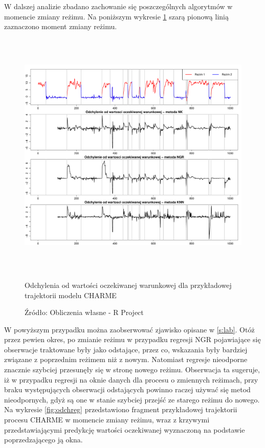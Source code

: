 \documentclass[man,mfu]{mgrwms}
\begin{document}
W dalszej analizie zbadano zachowanie się poszczególnych algorytmów w momencie zmiany reżimu. Na poniższym wykresie \ref{odch1} szarą pionową linią zaznaczono moment zmiany reżimu.

\begin{figure}[H]
\centering
\includegraphics[width=160mm,height = 120mm]{compreg}
\caption{Odchylenia od wartości oczekiwanej warunkowej dla przykładowej trajektorii modelu CHARME}
\caption*{Źródło: Obliczenia własne - R Project}
\label{odch1}
\end{figure}


W powyższym przypadku można zaobserwować zjawisko opisane w \ref{s:lab}. Otóż przez pewien okres, po zmianie reżimu w przypadku regresji NGR pojawiające się obserwacje traktowane były jako odstające, przez co, wskazania były bardziej związane z poprzednim reżimem niż z nowym. Natomiast regresje nieodporne znacznie szybciej przesunęły się w stronę nowego reżimu. Obserwacja ta sugeruje, iż w przypadku regresji na oknie danych dla procesu o zmiennych reżimach, przy braku występujących obserwacji odstających powinno raczej używać się metod nieodpornych, gdyż są one w stanie szybciej przejść ze starego reżimu do nowego. Na wykresie \ref{fig:odchreg} przedstawiono fragment przykładowej trajektorii procesu CHARME w momencie zmiany reżimu, wraz z krzywymi przedstawiającymi predykcję wartości oczekiwanej wyznaczoną na podstawie poprzedzającego ją okna.
\end{document}
